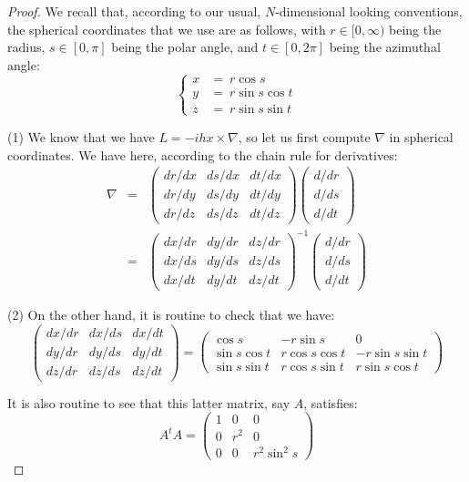 \documentclass[12pt]{amsbook}
\begin{document}
\begin{proof}
We recall that, according to our usual, $N$-dimensional looking conventions, the spherical coordinates that we use are as follows, with $r\in[0,\infty)$ being the radius, $s\in[0,\pi]$ being the polar angle, and $t\in[0,2\pi]$ being the azimuthal angle:
$$\begin{cases}
x\!\!\!&=\ r\cos s\\
y\!\!\!&=\ r\sin s\cos t\\
z\!\!\!&=\ r\sin s\sin t
\end{cases}$$

(1) We know that we have $L=-ihx\times\nabla$, so let us first compute $\nabla$ in spherical coordinates. We have here, according to the chain rule for derivatives:
\begin{eqnarray*}
\nabla
&=&\begin{pmatrix}
dr/dx&ds/dx&dt/dx\\
dr/dy&ds/dy&dt/dy\\
dr/dz&ds/dz&dt/dz
\end{pmatrix}
\begin{pmatrix}
d/dr\\
d/ds\\
d/dt
\end{pmatrix}\\
&=&\begin{pmatrix}
dx/dr&dy/dr&dz/dr\\
dx/ds&dy/ds&dz/ds\\
dx/dt&dy/dt&dz/dt
\end{pmatrix}^{-1}
\begin{pmatrix}
d/dr\\
d/ds\\
d/dt
\end{pmatrix}
\end{eqnarray*}

(2) On the other hand, it is routine to check that we have:
$$\begin{pmatrix}
dx/dr&dx/ds&dx/dt\\
dy/dr&dy/ds&dy/dt\\
dz/dr&dz/ds&dz/dt
\end{pmatrix}
=\begin{pmatrix}
\cos s&-r\sin s&0\\
\sin s\cos t&r\cos s\cos t&-r\sin s\sin t\\
\sin s\sin t&r\cos s\sin t&r\sin s\cos t
\end{pmatrix}$$

It is also routine to see that this latter matrix, say $A$, satisfies:
$$A^tA=\begin{pmatrix}1&0&0\\ 0&r^2&0\\ 0&0&r^2\sin^2s\end{pmatrix}$$


\end{proof}
\end{document}
